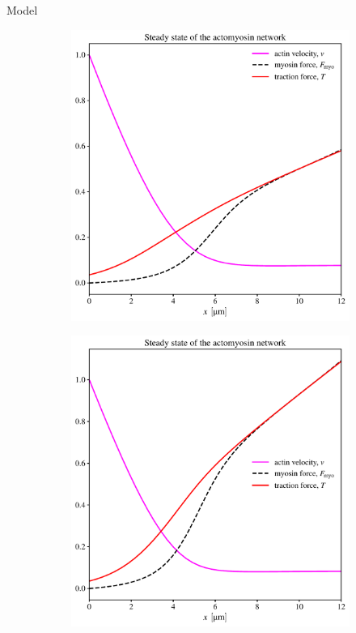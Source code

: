 \documentclass{beamer}
\newlength{\colwidth}
\begin{document}
\begin{frame}[t]
\begin{columns}[t]
\begin{column}{\colwidth}
\begin{block}{Model}
\begin{figure}
    \begin{subfigure}{0.3\textwidth}
    \centering
    \includegraphics[width=\linewidth]{../.figures/steady_state_og.pdf}
    \caption{\label{fig:steady_og}}
    \end{subfigure}%
    \hfill
    \begin{subfigure}{0.3\textwidth}
    \centering
    \includegraphics[width=\linewidth]{../.figures/steady_state_og_highF.pdf}

\end{subfigure}
\end{figure}
\end{block}
\end{column}
\end{columns}
\end{frame}
\end{document}
